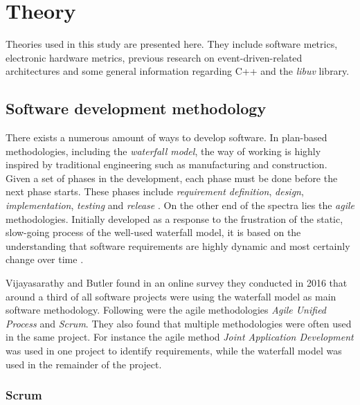 \chapter{Theory}
\label{cha:theory}

Theories used in this study are presented here. They include software metrics,
electronic hardware metrics, previous research on event-driven-related
architectures and some general information regarding C++ and the \textit{libuv}
library.

\section{Software development methodology}

There exists a numerous amount of ways to develop software. In plan-based
methodologies, including the \textit{waterfall model}, the way of working is
highly inspired by traditional engineering such as manufacturing and
construction. Given a set of phases in the development, each phase must be done
before the next phase starts. These phases include \textit{requirement
definition}, \textit{design}, \textit{implementation}, \textit{testing} and
\textit{release} \cite{crookshanks2014practical}. On the other end of the
spectra lies the \textit{agile} methodologies. Initially developed as a
response to the frustration of the static, slow-going process of the well-used
waterfall model, it is based on the understanding that software requirements
are highly dynamic and most certainly change over time
\cite{moniruzzaman2013comparative}.

Vijayasarathy and Butler \cite{vijayasarathy2016choice} found in an online
survey they conducted in 2016 that around a third of all software projects were
using the waterfall model as main software methodology. Following were the
agile methodologies \textit{Agile Unified Process} and \textit{Scrum}. They
also found that multiple methodologies were often used in the same project.
For instance the agile method \textit{Joint Application Development} was used
in one project to identify requirements, while the waterfall model was used in
the remainder of the project.

\subsection{Scrum}

